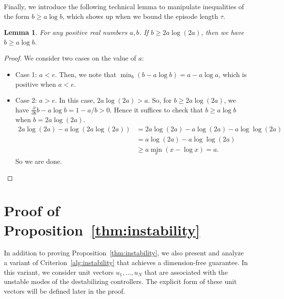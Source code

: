 \documentclass[11pt, twoside]{article}
\newtheorem{lemma}[theorem]{Lemma}
\theoremstyle{definition}
\begin{document}
Finally, we introduce the following technical lemma to manipulate inequalities of the form $b \ge a \log b$, which shows up when we bound the episode length $\tau$. 
\begin{lemma}
\label{thm:nlogn-bound}
    For any positive real numbers $a, b$.
    If $b \ge 2a\log(2a)$, then we have $b \ge a \log b$.
\end{lemma}

\begin{proof}
    We consider two cases on the value of $a$:
    \begin{itemize}
        \item Case 1: $a < e$. Then, we note that $\min_b (b - a\log b) = a - a \log a$, which is positive when $a < e$.
        \item Case 2: $a > e$. In this case, $2a \log(2a) > a$.
        So, for $b \ge 2a \log(2a)$, we have $\frac{\partial}{\partial b} b - a \log b = 1 - a/b > 0$.
        Hence it suffices to check that $b \ge a \log b$ when $b = 2a\log(2a)$.
        \begin{align*}
            2a \log(2a) - a \log(2a \log(2a))
            &= 2a \log(2a) - a \log(2a) - a \log\log(2a) \\
            &= a \log(2a) - a \log\log(2a) \\
            &\ge a \min_x (x - \log x) = a.
        \end{align*}
        So we are done.
    \end{itemize}
\end{proof} 
\section{Proof of Proposition~\ref{thm:instability}}
\label{sec:proof-instability}
In addition to proving Proposition~\ref{thm:instability}, we also present and analyze a variant of Criterion~\ref{alg:instability} that achieves a dimension-free guarantee.
In this variant, we consider unit vectors $u_1, \dots, u_N$ that are associated with the unstable modes of the destabilizing controllers.
The explicit form of these unit vectors will be defined later in the proof.
\end{document}
